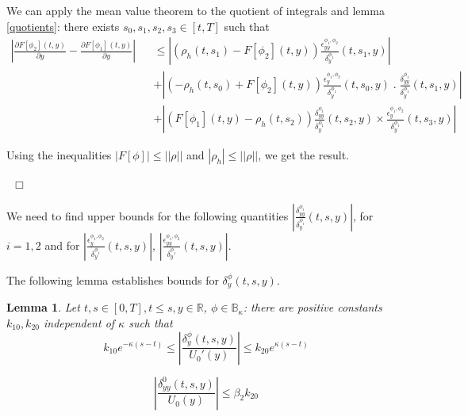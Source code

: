 \documentclass[11pt, psfig]{article}
\newtheorem{lemma}[theorem]{Lemma}
\theoremstyle{definition}
\theoremstyle{remark}
\numberwithin{equation}{section}
\def\sR{\mathbb{R}}
\def\sR{\mathbb{R}}
\newcommand{\be}{\begin{equation}}
\newcommand{\ee}{\end{equation}}
\def \ep{\hbox{ }\hfill$\Box$}
\begin{document}
We can apply the mean value theorem to the quotient of integrals and lemma \ref{quotients}:
  there exists $ s_0, s_1, s_2, s_3 \in [t,T]$ such that
\begin{eqnarray*}
|\frac{\partial F[\phi_2](t,y)}{\partial y}-\frac{\partial F[\phi_1](t,y)}{\partial y}|&& \leq |(\rho_h(t,s_1)-F[\phi_2](t,y))  \frac{\epsilon_{yy}^{\phi_1,\phi_2}}{\delta_y^{\phi_1}}(t,s_1,y)| \\
&&+ 
 |(-\rho_h(t,s_0)+F[\phi_2](t,y))  \frac{\epsilon_{y}^{\phi_1,\phi_2}}{\delta_y^{\phi_1}}(t,s_0,y) \; . \; \frac{\delta_{yy}^{\phi_1}}{\delta_y^{\phi_1}}(t,s_1,y)| \\
&&+
|(F[\phi_1](t,y)-\rho_h(t,s_2))\frac{\delta_{yy}^{\phi_1}}{\delta_y^{\phi_1}}(t,s_2,y)\times \frac{\epsilon_y^{\phi_1,\phi_2}}{\delta_y^{\phi_1}}(t,s_3,y)|
\end{eqnarray*}


Using the inequalities $|F[\phi]| \leq ||\rho|| $ and $|\rho_h | \leq ||\rho||$, we get the result.

\ep

We need to find upper bounds for the following quantities 
$|\frac{\delta_{yy}^{\phi_i}}{\delta_y^{\phi_i}}(t,s,y)|$, 
for $i=1, 2$ and for $|\frac{\epsilon_{y}^{\phi_1,\phi_2}}{\delta_y^{\phi_1}}(t,s,y)|$, $|\frac{\epsilon_{yy}^{\phi_1,\phi_2}}{\delta_y^{\phi_1}}(t,s,y)|$.


The following lemma establishes bounds for $\delta_y^{\phi}(t,s,y)$.


\begin{lemma}
Let $t, s \in [0,T], t\leq s, y\in \sR$,  $\phi \in \mathbb{B}_{\kappa}$:
there are positive constants $k_{10}, k_{20}$ independent of $\kappa$ such that
\be
 k_{10}e^{- \kappa(s-t)} \leq | \frac{ \delta_y^{\phi}(t,s,y)}{U_0'(y)}|  \leq  k_{20}e^{ \kappa(s-t)}
\ee

\be 
|\frac{ \delta_{yy}^{0}(t,s,y)}{U_0(y)}|   \leq  \beta_2 k_{20}  
\ee

\end{lemma}
\end{document}
